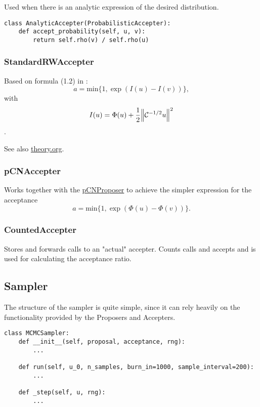 \documentclass[11pt]{article}
\newcommand{\C}{{\mathcal{C}}}
\begin{document}
Used when there is an analytic expression of the desired distribution.

\begin{verbatim}
class AnalyticAccepter(ProbabilisticAccepter):
    def accept_probability(self, u, v):
        return self.rho(v) / self.rho(u)
\end{verbatim}

\subsubsection{StandardRWAccepter}
\label{sec:orga92bd8d}

Based on formula (1.2) in \cite{cotter_mcmc_2013}:
$$a = \text{min}\{1, \exp(I(u) - I(v))\},$$ with
$$I(u) = \Phi(u) + \frac{1}{2}\norm{\C^{-1/2}u}^2$$.

See also \url{theory.org}.

\subsubsection{pCNAccepter}
\label{sec:orge50bf67}

Works together with the \hyperref[sec:org1253113]{pCNProposer} to achieve the simpler expression for the acceptance
$$a = \text{min}\{1, \exp(\Phi(u) - \Phi(v))\}.$$

\subsubsection{CountedAccepter}
\label{sec:org938869b}

Stores and forwards calls to an "actual" accepter. Counts calls and accepts and is used for
calculating the acceptance ratio.

\subsection{Sampler}
\label{sec:orgb1900cc}

The structure of the sampler is quite simple, since it can rely heavily on the functionality
provided by the Proposers and Accepters.

\begin{verbatim}
class MCMCSampler:
    def __init__(self, proposal, acceptance, rng):
        ...

    def run(self, u_0, n_samples, burn_in=1000, sample_interval=200):
        ...

    def _step(self, u, rng):
        ...
\end{verbatim}
\end{document}
